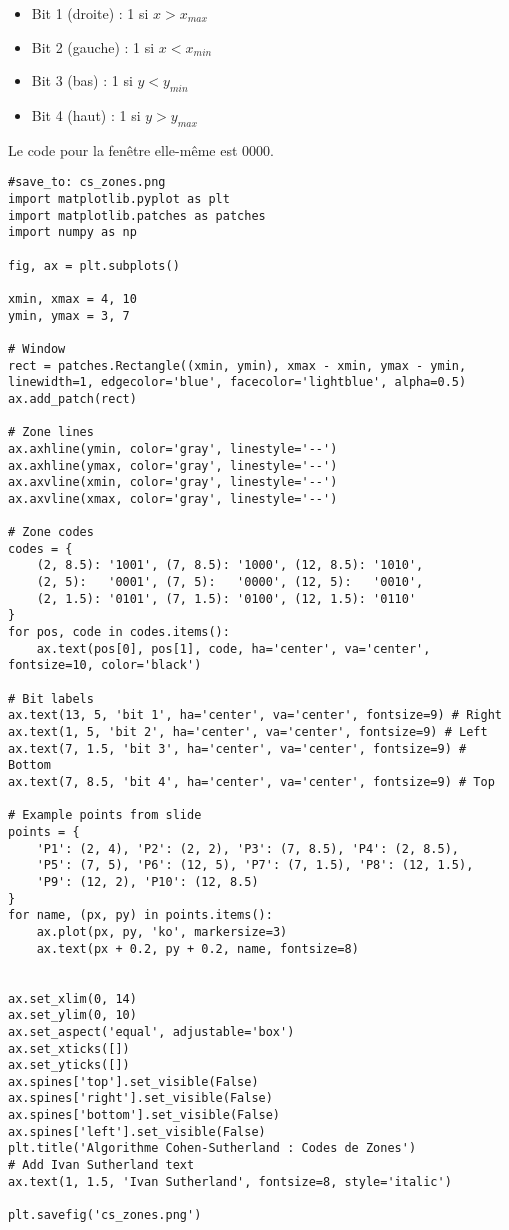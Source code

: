 \documentclass{article}
\begin{document}
\begin{itemize}
    \item Bit 1 (droite) : 1 si $x > x_{max}$
    \item Bit 2 (gauche) : 1 si $x < x_{min}$
    \item Bit 3 (bas) : 1 si $y < y_{min}$
    \item Bit 4 (haut) : 1 si $y > y_{max}$
\end{itemize}
Le code pour la fenêtre elle-même est 0000.

\begin{verbatim}
#save_to: cs_zones.png
import matplotlib.pyplot as plt
import matplotlib.patches as patches
import numpy as np

fig, ax = plt.subplots()

xmin, xmax = 4, 10
ymin, ymax = 3, 7

# Window
rect = patches.Rectangle((xmin, ymin), xmax - xmin, ymax - ymin, linewidth=1, edgecolor='blue', facecolor='lightblue', alpha=0.5)
ax.add_patch(rect)

# Zone lines
ax.axhline(ymin, color='gray', linestyle='--')
ax.axhline(ymax, color='gray', linestyle='--')
ax.axvline(xmin, color='gray', linestyle='--')
ax.axvline(xmax, color='gray', linestyle='--')

# Zone codes
codes = {
    (2, 8.5): '1001', (7, 8.5): '1000', (12, 8.5): '1010',
    (2, 5):   '0001', (7, 5):   '0000', (12, 5):   '0010',
    (2, 1.5): '0101', (7, 1.5): '0100', (12, 1.5): '0110'
}
for pos, code in codes.items():
    ax.text(pos[0], pos[1], code, ha='center', va='center', fontsize=10, color='black')

# Bit labels
ax.text(13, 5, 'bit 1', ha='center', va='center', fontsize=9) # Right
ax.text(1, 5, 'bit 2', ha='center', va='center', fontsize=9) # Left
ax.text(7, 1.5, 'bit 3', ha='center', va='center', fontsize=9) # Bottom
ax.text(7, 8.5, 'bit 4', ha='center', va='center', fontsize=9) # Top

# Example points from slide
points = {
    'P1': (2, 4), 'P2': (2, 2), 'P3': (7, 8.5), 'P4': (2, 8.5),
    'P5': (7, 5), 'P6': (12, 5), 'P7': (7, 1.5), 'P8': (12, 1.5),
    'P9': (12, 2), 'P10': (12, 8.5)
}
for name, (px, py) in points.items():
    ax.plot(px, py, 'ko', markersize=3)
    ax.text(px + 0.2, py + 0.2, name, fontsize=8)


ax.set_xlim(0, 14)
ax.set_ylim(0, 10)
ax.set_aspect('equal', adjustable='box')
ax.set_xticks([])
ax.set_yticks([])
ax.spines['top'].set_visible(False)
ax.spines['right'].set_visible(False)
ax.spines['bottom'].set_visible(False)
ax.spines['left'].set_visible(False)
plt.title('Algorithme Cohen-Sutherland : Codes de Zones')
# Add Ivan Sutherland text
ax.text(1, 1.5, 'Ivan Sutherland', fontsize=8, style='italic')

plt.savefig('cs_zones.png')
\end{verbatim}
\end{document}
